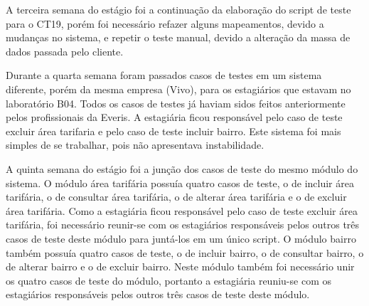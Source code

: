 A terceira semana do estágio foi a continuação da elaboração do script de teste para o CT19, porém foi necessário refazer alguns mapeamentos, devido a mudanças no sistema, e repetir o teste manual, devido a alteração da massa de dados passada pelo cliente.

Durante a quarta semana foram passados casos de testes em um sistema diferente, porém da mesma empresa (Vivo), para os estagiários que estavam no laboratório B04. Todos os casos de testes já haviam sidos feitos anteriormente pelos profissionais da Everis. A estagiária ficou responsável pelo caso de teste excluir área tarifaria e pelo caso de teste incluir bairro. Este sistema foi mais simples de se trabalhar, pois não apresentava instabilidade.

A quinta semana do estágio foi a junção dos casos de teste do mesmo módulo do sistema. O módulo área tarifária possuía quatro casos de teste, o de incluir área tarifária, o de consultar área tarifária, o de alterar área tarifária e o de excluir área tarifária. Como a estagiária ficou responsável pelo caso de teste excluir área tarifária, foi necessário reunir-se com os estagiários responsáveis pelos outros três casos de teste deste módulo para juntá-los em um único script. O módulo bairro também possuía quatro casos de teste, o de incluir bairro, o de consultar bairro, o de alterar bairro e o de excluir bairro. Neste módulo também foi necessário unir os quatro casos de teste do módulo, portanto a estagiária reuniu-se com os estagiários responsáveis pelos outros três casos de teste deste módulo.